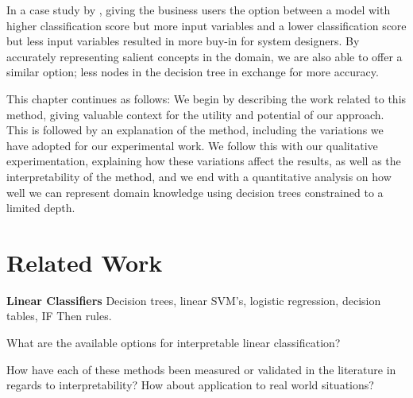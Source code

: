 In a case study by  \cite{Veale2017}, giving the business users the option between a model with higher classification score but more input variables and a lower classification score but less input variables resulted in more buy-in for system designers. By accurately representing salient concepts in the domain, we are also able to offer a similar option; less nodes in the decision tree in exchange for more accuracy. %







This chapter continues as follows: We begin by describing the work related to this method, giving valuable context for the utility and potential of our approach. This is followed by an explanation of the method, including the variations we have adopted for our experimental work. We follow this with our qualitative experimentation, explaining how these variations affect the results, as well as the interpretability of the method, and we end with a quantitative analysis on how well we can represent domain knowledge using decision trees constrained to a limited depth.



\section{Related Work}

\textbf{Linear Classifiers}
Decision trees, linear SVM's, logistic regression, decision tables, IF Then rules.

What are the available options for interpretable linear classification?

How have each of these methods been measured or validated in the literature in regards to interpretability? How about application to real world situations?

